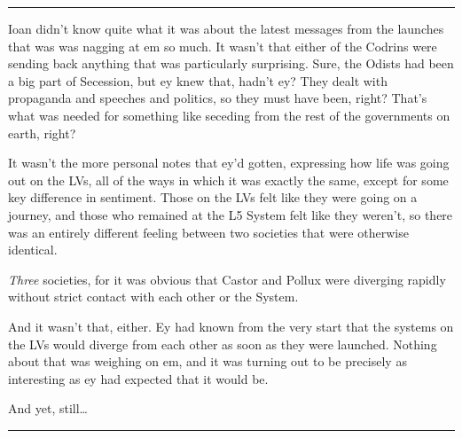 \begin{center}\rule{0.5\linewidth}{0.5pt}\end{center}

\noindent Ioan didn't know quite what it was about the latest messages from the launches that was was nagging at em so much. It wasn't that either of the Codrins were sending back anything that was particularly surprising. Sure, the Odists had been a big part of Secession, but ey knew that, hadn't ey? They dealt with propaganda and speeches and politics, so they must have been, right? That's what was needed for something like seceding from the rest of the governments on earth, right?

It wasn't the more personal notes that ey'd gotten, expressing how life was going out on the LVs, all of the ways in which it was exactly the same, except for some key difference in sentiment. Those on the LVs felt like they were going on a journey, and those who remained at the L5 System felt like they weren't, so there was an entirely different feeling between two societies that were otherwise identical.

\emph{Three} societies, for it was obvious that Castor and Pollux were diverging rapidly without strict contact with each other or the System.

And it wasn't that, either. Ey had known from the very start that the systems on the LVs would diverge from each other as soon as they were launched. Nothing about that was weighing on em, and it was turning out to be precisely as interesting as ey had expected that it would be.

And yet, still\ldots{}

\begin{center}\rule{0.5\linewidth}{0.5pt}\end{center}

